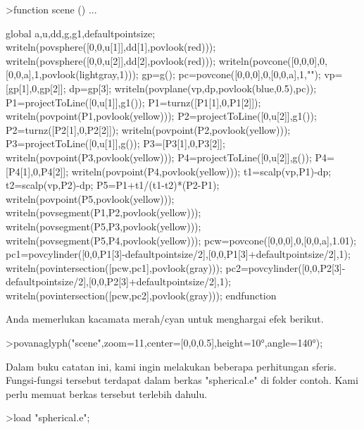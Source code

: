 \documentclass[a4paper,10pt]{article}
\begin{document}
\begin{eulernotebook}
\begin{eulercomment}
\begin{eulercomment}
\begin{eulercomment}
\begin{eulercomment}
\begin{eulercomment}
\begin{eulercomment}
\begin{eulercomment}
\begin{eulercomment}
\begin{eulercomment}
\begin{eulercomment}
\begin{eulercomment}
\begin{eulercomment}
\begin{eulercomment}
\begin{eulercomment}
\begin{eulercomment}
\begin{eulercomment}
\begin{eulercomment}
\begin{eulercomment}
\begin{eulerprompt}
>function scene () ...
\end{eulerprompt}
\begin{eulerudf}
  global a,u,dd,g,g1,defaultpointsize;
  writeln(povsphere([0,0,u[1]],dd[1],povlook(red)));
  writeln(povsphere([0,0,u[2]],dd[2],povlook(red)));
  writeln(povcone([0,0,0],0,[0,0,a],1,povlook(lightgray,1)));
  gp=g();
  pc=povcone([0,0,0],0,[0,0,a],1,"");
  vp=[gp[1],0,gp[2]]; dp=gp[3];
  writeln(povplane(vp,dp,povlook(blue,0.5),pc));
  P1=projectToLine([0,u[1]],g1()); P1=turnz([P1[1],0,P1[2]]);
  writeln(povpoint(P1,povlook(yellow)));
  P2=projectToLine([0,u[2]],g1()); P2=turnz([P2[1],0,P2[2]]);
  writeln(povpoint(P2,povlook(yellow)));
  P3=projectToLine([0,u[1]],g()); P3=[P3[1],0,P3[2]];
  writeln(povpoint(P3,povlook(yellow)));
  P4=projectToLine([0,u[2]],g()); P4=[P4[1],0,P4[2]];
  writeln(povpoint(P4,povlook(yellow)));
  t1=scalp(vp,P1)-dp; t2=scalp(vp,P2)-dp; P5=P1+t1/(t1-t2)*(P2-P1);
  writeln(povpoint(P5,povlook(yellow)));
  writeln(povsegment(P1,P2,povlook(yellow)));
  writeln(povsegment(P5,P3,povlook(yellow)));
  writeln(povsegment(P5,P4,povlook(yellow)));
  pcw=povcone([0,0,0],0,[0,0,a],1.01);
  pc1=povcylinder([0,0,P1[3]-defaultpointsize/2],[0,0,P1[3]+defaultpointsize/2],1);
  writeln(povintersection([pcw,pc1],povlook(gray)));
  pc2=povcylinder([0,0,P2[3]-defaultpointsize/2],[0,0,P2[3]+defaultpointsize/2],1);
  writeln(povintersection([pcw,pc2],povlook(gray)));
  endfunction
\end{eulerudf}
\begin{eulercomment}
Anda memerlukan kacamata merah/cyan untuk menghargai efek berikut.
\end{eulercomment}
\begin{eulerprompt}
>povanaglyph("scene",zoom=11,center=[0,0,0.5],height=10°,angle=140°);
\end{eulerprompt}
\begin{eulercomment}
Dalam buku catatan ini, kami ingin melakukan beberapa perhitungan
sferis. Fungsi-fungsi tersebut terdapat dalam berkas "spherical.e" di
folder contoh. Kami perlu memuat berkas tersebut terlebih dahulu.
\end{eulercomment}
\begin{eulerprompt}
>load "spherical.e";
\end{eulerprompt}
\begin{eulercomment}

\end{eulercomment}
\end{eulercomment}
\end{eulercomment}
\end{eulercomment}
\end{eulercomment}
\end{eulercomment}
\end{eulercomment}
\end{eulercomment}
\end{eulercomment}
\end{eulercomment}
\end{eulercomment}
\end{eulercomment}
\end{eulercomment}
\end{eulercomment}
\end{eulercomment}
\end{eulercomment}
\end{eulercomment}
\end{eulercomment}
\end{eulercomment}
\end{eulernotebook}
\end{document}
